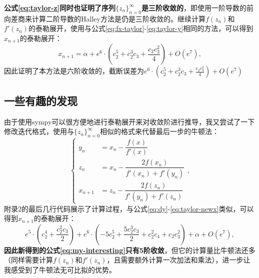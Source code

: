 \textbf{公式\ref{eq:taylor-z}同时也证明了序列$\{z_n\}_{n=0}^\infty$是三阶收敛的}，即使用一阶导数的前向差商来计算二阶导数的Halley方法是仍是三阶收敛的。继续计算$f(z_n)$和$f'(z_n)$的泰勒展开，使用与公式\ref{eq:fx-taylor}-\ref{eq:taylor-y}相同的方法，可以得到$x_{n+1}$的泰勒展开：
\begin{equation}
    \label{eq:taylor-newx}
    x_{n+1} = \alpha + e^{6} \cdot \left(c_{2}^{5} + c_{2}^{3} c_{3} + \frac{c_{2} c_{3}^{2}}{4}\right) + O\left(e^{7}\right),
\end{equation}
因此证明了本方法是六阶收敛的，截断误差为$e^{6} \cdot \left(c_{2}^{5} + c_{2}^{3} c_{3} + \frac{c_{2} c_{3}^{2}}{4}\right) + O\left(e^{7}\right)$


\subsection{一些有趣的发现}

由于使用sympy可以很方便地进行泰勒展开来对收敛阶进行推导，我又尝试了一下修改迭代格式，使用与$\{z_n\}_{n=0}^\infty$相似的格式来代替最后一步的牛顿法：
\begin{equation}
    \label{eq:my-interesting}
    \begin{cases}
        y_n &= x_n - \dfrac{f(x)}{f'(x)} \\
        z_n &= x_n - \dfrac{2f(x_n)}{f'(x_n) + f'(y_n)} \\
        x_{n+1} &= z_n - \dfrac{2f(z_n)}{f'(y_n) + f'(z_n)}
    \end{cases},
\end{equation}
附录2的最后几行代码展示了计算过程，与公式\ref{eq:dy}-\ref{eq:taylor-newx}类似，可以得到$x_{n+1}$的泰勒展开：
\begin{equation}
    e^{5} \cdot \left(c_{2}^{4} + \frac{c_{2}^{2} c_{3}}{2}\right) + e^{6} \cdot \left(- 5 c_{2}^{5} + \frac{5 c_{2}^{3} c_{3}}{2} + c_{2}^{2} c_{4} + c_{2} c_{3}^{2}\right) + \alpha + O\left(e^{7}\right),
\end{equation}
\textbf{因此新得到的公式\ref{eq:my-interesting}只有5阶收敛}，但它的计算量比牛顿法还多（同样需要计算$f(z_n)$和$f'(z_n)$，且需要额外计算一次加法和乘法），进一步让我感受到了牛顿法无可比拟的优势。




